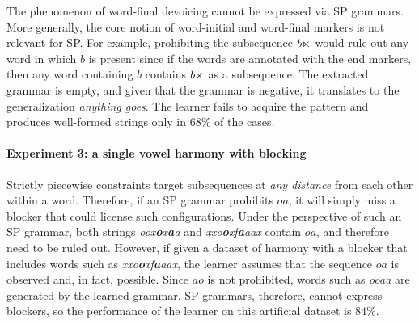 The phenomenon of word-final devoicing cannot be expressed via SP grammars. 
More generally, the core notion of word-initial and word-final markers is not relevant for SP.
For example, prohibiting the subsequence $b \ltimes$ would rule out any word in which $b$ is present since if the words are annotated with the end markers, then any word containing $b$ contains $b\ltimes$ as a subsequence.
The extracted grammar is empty, and given that the grammar is negative, it translates to the generalization \emph{anything goes}.
The learner fails to acquire the pattern and produces well-formed strings only in $68$\% of the cases.


\begin{table}[h!]
\centering
{}
\caption{SP learning of the word-final devoicing; abstract representation.}
\end{table}




\paragraph{Experiment 3: a single vowel harmony with blocking}


Strictly piecewise constraints target subsequences at \emph{any distance} from each other within a word.
Therefore, if an SP grammar prohibits $oa$, it will simply miss a blocker that could license such configurations.
Under the perspective of such an SP grammar, both strings \emph{oox\textbf{o}x\textbf{a}a} and \emph{xxo\textbf{o}xf\textbf{a}aax} contain $oa$, and therefore need to be ruled out.
However, if given a dataset of harmony with a blocker that includes words such as \emph{xxo\textbf{o}xf\textbf{a}aax}, the learner assumes that the sequence $oa$ is observed and, in fact, possible.
Since $ao$ is not prohibited, words such as \emph{ooaa} are generated by the learned grammar.
SP grammars, therefore, cannot express blockers, so the performance of the learner on this artificial dataset is $84$\%.


